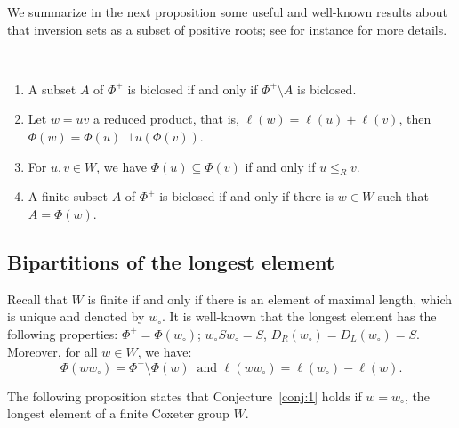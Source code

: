 \documentclass[Unicode]{cedram-alco}
\theoremstyle{definition}
\begin{document}
We summarize in the next proposition some useful and well-known results about that inversion sets as a subset of positive roots; see for instance \cite[\S2.2-2.3]{HoLa16} for more details.

\begin{prop}\label{prop:Biclos}\
\begin{enumerate}
\item A subset $A$ of $\Phi^+$ is biclosed if and only if $\Phi^+\setminus A$ is biclosed. 
\item Let $w=uv$ a reduced product, that is, $\ell(w)=\ell(u)+\ell(v)$, then $\Phi(w)=\Phi(u)\sqcup u(\Phi(v))$.
\item For $u,v\in W$, we have $\Phi(u)\subseteq \Phi(v)$ if and only if $u\leq_R v$. 
\item A finite subset $A$ of $\Phi^+$ is biclosed if and only if there is $w\in W$ such that $A=\Phi(w)$.
\end{enumerate}
\end{prop}


\subsection{Bipartitions of the longest element} Recall that $W$ is finite if and only if there is an element of maximal length, which is unique and denoted by $w_\circ$. It is well-known that the longest element has the following properties: $\Phi^+=\Phi(w_\circ)$; $w_\circ Sw_\circ = S$, $D_R(w_\circ)=D_L(w_\circ)=S$. Moreover,  for all $w\in W$, we have:
$$
\Phi(ww_\circ)=\Phi^+\setminus \Phi(w)\ \textrm{ and } \ell(ww_\circ)=\ell(w_\circ) - \ell(w).
$$ 

The following proposition states that Conjecture~\ref{conj:1} holds if $w=w_\circ$, the longest element of a finite Coxeter group $W$.
\end{document}
